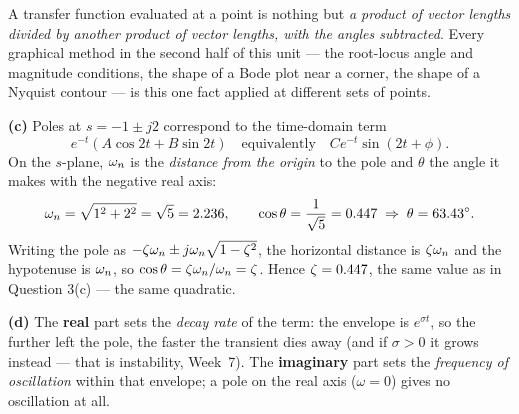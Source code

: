 \documentclass[11pt,a4paper]{article}
\begin{document}
\begin{solution}
\begin{keyidea}
A transfer function evaluated at a point is nothing but \emph{a product of
vector lengths divided by another product of vector lengths, with the angles
subtracted}. Every graphical method in the second half of this unit ---
the root-locus angle and magnitude conditions, the shape of a Bode plot near a
corner, the shape of a Nyquist contour --- is this one fact applied at
different sets of points.
\end{keyidea}

\medskip
\textbf{(c)} Poles at $s=-1\pm j2$ correspond to the time-domain term
\[
  e^{-t}\left(A\cos 2t+B\sin 2t\right)
  \quad\text{equivalently}\quad
  Ce^{-t}\sin(2t+\phi).
\]
On the $s$-plane, $\omega_{n}$ is the \emph{distance from the origin} to the pole and
$\theta$ the angle it makes with the negative real axis:
\[
  \omega_{n}=\sqrt{1^{2}+2^{2}}=\sqrt{5}=2.236,
  \qquad
  \cos\theta=\frac{1}{\sqrt 5}=0.447
  \;\Rightarrow\; \theta=\ang{63.43}.
\]
Writing the pole as $-\zeta\omega_{n}\pm j\omega_{n}\sqrt{1-\zeta^{2}}$, the horizontal distance
is $\zeta\omega_{n}$ and the hypotenuse is $\omega_{n}$, so
$\cos\theta=\zeta\omega_{n}/\omega_{n}=\zeta$. Hence $\zeta=0.447$, the same value as in
Question 3(c) --- the same quadratic.

\begin{center}
\end{center}

\textbf{(d)} The \textbf{real} part sets the \emph{decay rate} of the term:
the envelope is $e^{\sigma t}$, so the further left the pole, the faster the
transient dies away (and if $\sigma>0$ it grows instead --- that is
instability, Week~7). The \textbf{imaginary} part sets the \emph{frequency of
oscillation} within that envelope; a pole on the real axis
($\omega=0$) gives no oscillation at all.
\end{solution}
\end{document}
